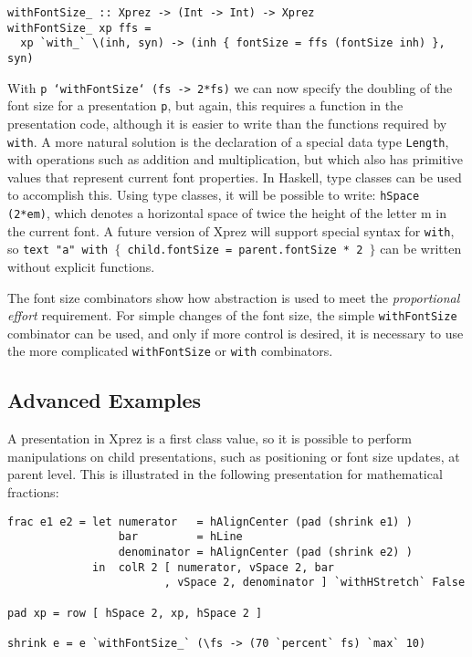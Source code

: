\begin{small}
\begin{verbatim}
withFontSize_ :: Xprez -> (Int -> Int) -> Xprez
withFontSize_ xp ffs = 
  xp `with_` \(inh, syn) -> (inh { fontSize = ffs (fontSize inh) }, syn)
\end{verbatim}
\end{small}

With \texttt{p `withFontSize` (fs -> 2*fs)} we can now specify the doubling of the font size for a presentation \texttt{p}, but again, this requires a function in the presentation code, although it is easier to write than the functions required by \texttt{with}. A more natural solution is the declaration of a special data type \texttt{Length}, with operations such as addition and multiplication, but which also has primitive values that represent current font properties. In Haskell, type classes can be used to accomplish this. Using type classes, it will be possible to write: \linebreak \texttt{hSpace (2*em)}, which denotes a horizontal space of twice the height of the letter m in the current font. A future version of {\sc Xprez} will support special syntax for \texttt{with}, so \texttt{text "a" with $\{$ child.fontSize = parent.fontSize * 2 $\}$} can be written without explicit functions.

The font size combinators show how abstraction is used to meet the {\em proportional effort} requirement. For simple changes of the font size, the simple \texttt{withFontSize} combinator can be used, and only if more control is desired, it is necessary to use the more complicated \texttt{withFontSize} or \texttt{with} combinators.


%																
\subsection{Advanced Examples}

A presentation in {\sc Xprez} is a first class value, so it is possible to perform manipulations on child presentations, such as positioning or font size updates, at parent level. This is illustrated in the following presentation for mathematical fractions: 

\begin{small}
\begin{verbatim}
frac e1 e2 = let numerator   = hAlignCenter (pad (shrink e1) )
                 bar         = hLine
                 denominator = hAlignCenter (pad (shrink e2) )
             in  colR 2 [ numerator, vSpace 2, bar
                        , vSpace 2, denominator ] `withHStretch` False

pad xp = row [ hSpace 2, xp, hSpace 2 ]

shrink e = e `withFontSize_` (\fs -> (70 `percent` fs) `max` 10)
\end{verbatim}
\end{small}


